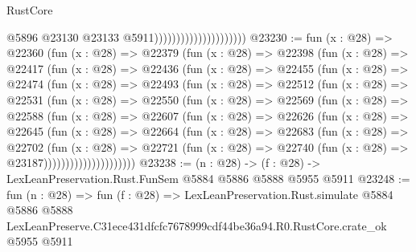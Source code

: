 \begin{lexlean}{RustCore}
\begin{coremodule}
                                              @5896
                                              @23130
                                              @23133
                                              @5911)))))))))))))))))))))
@23230 := fun (x : @28) =>
  @22360
    (fun (x : @28) =>
    @22379
      (fun (x : @28) =>
      @22398
        (fun (x : @28) =>
        @22417
          (fun (x : @28) =>
          @22436
            (fun (x : @28) =>
            @22455
              (fun (x : @28) =>
              @22474
                (fun (x : @28) =>
                @22493
                  (fun (x : @28) =>
                  @22512
                    (fun (x : @28) =>
                    @22531
                      (fun (x : @28) =>
                      @22550
                        (fun (x : @28) =>
                        @22569
                          (fun (x : @28) =>
                          @22588
                            (fun (x : @28) =>
                            @22607
                              (fun (x : @28) =>
                              @22626
                                (fun (x : @28) =>
                                @22645
                                  (fun (x : @28) =>
                                  @22664
                                    (fun (x : @28) =>
                                    @22683
                                      (fun (x : @28) =>
                                      @22702
                                        (fun (x : @28) =>
                                        @22721
                                          (fun (x : @28) =>
                                          @22740 (fun (x : @28) => @23187)))))))))))))))))))))
@23238 := (n : @28) -> (f : @28) -> LexLeanPreservation.Rust.FunSem @5884 @5886 @5888 @5955 @5911
@23248 := fun (n : @28) =>
  fun (f : @28) =>
  LexLeanPreservation.Rust.simulate
    @5884
    @5886
    @5888
    LexLeanPreserve.C31ece431dfcfc7678999cdf44be36a94.R0.RustCore.crate_ok
    @5955
    @5911
\end{coremodule}
\end{lexlean}
